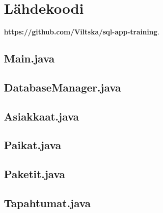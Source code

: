 \documentclass[11pt,a4paper]{article}
\begin{document}
\newpage
\section{Lähdekoodi}
\textbf{https://github.com/Viltska/sql-app-training}.

\subsection*{Main.java}

\subsection*{DatabaseManager.java}

\subsection*{Asiakkaat.java}

\subsection*{Paikat.java}

\subsection*{Paketit.java}

\subsection*{Tapahtumat.java}

\end{document}
